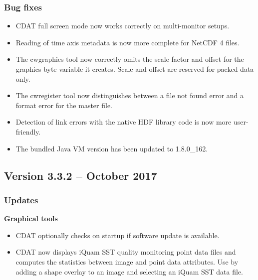 \subsubsection*{ Bug fixes}
\begin{itemize}

  \item CDAT full screen mode now works correctly on multi-monitor setups.

  \item Reading of time axis metadata is now more complete for NetCDF 4 files.

  \item The cwgraphics tool now correctly omits the scale factor and offset
  for the graphics byte variable it creates.  Scale and offset are reserved
  for packed data only.

  \item The cwregister tool now distinguishes between a file not found error
  and a format error for the master file.

  \item Detection of link errors with the native HDF library code is now more
  user-friendly.

  \item The bundled Java VM version has been updated to 1.8.0\_162.

\end{itemize}


\subsection*{Version 3.3.2 -- October 2017}

\subsubsection*{ Updates}

\hspace{0.4cm} {\bf Graphical tools}

\begin{itemize}

  \item CDAT optionally checks on startup if software update is available.

  \item CDAT now displays iQuam SST quality monitoring point data files and
  computes the statistics between image and point data attributes.  Use
  by adding a shape overlay to an image and selecting an iQuam SST data file.

\end{itemize}


